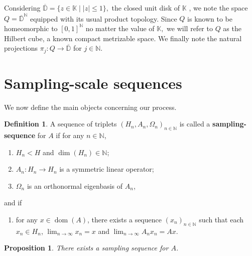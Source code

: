 \documentclass{amsart}
\newtheorem{prop}[thm]{Proposition}
\theoremstyle{definition}
\newtheorem{defn}[thm]{Definition}
\theoremstyle{remark}
\def \Dom{\operatorname{dom}}
\newcounter{pointnumber}
\begin{document}
Considering $\overline{\mathbb{D}}=\{z\in\mathbb{K}\;|\; |z|\leq 1\},$ the closed unit disk of $\mathbb{K}$ , we note the space $Q=\overline{\mathbb{D}}^{\mathbb{N}}$ equipped with its usual product topology. Since $Q$ is known to be homeomorphic to $[0,1]^{\mathbb{N}}$ no matter the value of $\mathbb{K},$ we will refer to $Q$ as the Hilbert cube, a known compact metrizable space. We finally note the natural projections $\pi_j:Q\rightarrow\overline{\mathbb{D}}$ for $j\in\mathbb{N}.$
\section{Sampling-scale sequences}\label{section_sampling}

We now define the main objects concerning our process.
\begin{defn}\label{definition_sampling}
	A sequence of triplets $(H_n,A_n,\Omega_n)_{n\in\mathbb{N}}$ is called a \textbf{sampling-sequence} for $A$ if for any $n\in\mathbb{N}$,
	\begin{enumerate}
		\item\label{property_sampling_finite_dim} $H_n< H$ and $\operatorname{dim}(H_n)\in\mathbb{N}$;
		\item\label{property_sampling_symmetric_op} $A_n: H_n\rightarrow H_n$ is a symmetric linear operator;
		\item\label{property_sampling_eigenbasis} $\Omega_n$ is an orthonormal eigenbasis of $A_n$,
		\setcounter{pointnumber}{\value{enumi}}
	\end{enumerate}
	and if
	\begin{enumerate}
		\setcounter{enumi}{\value{pointnumber}}
		\item\label{property_sampling_approx} for any $x\in\Dom(A)$, there exists a sequence $(x_n)_{n\in\mathbb{N}}$ such that each $x_n\in H_n$, $\lim_{n\rightarrow\infty}x_n=x$ and $\lim_{n\rightarrow\infty} A_n x_n=Ax.$
		\setcounter{pointnumber}{\value{enumi}}
	\end{enumerate}
\end{defn}
\begin{prop}\label{proposition_sampling_existence}
	There exists a sampling sequence for $A$.
\end{prop}
\end{document}
